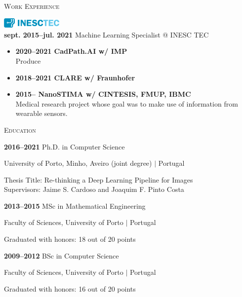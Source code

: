 \documentclass[12pt]{article}
\begin{document}
\begin{minipage}[t]{0.55\textwidth}
\setlength{\parskip}{1em}

\textsc{\large Work Experience}

\includegraphics[width=8em]{imgs/career-inesctec.png}\\
\textbf{sept. 2015--jul. 2021} Machine Learning Specialist @ INESC TEC
\begin{itemize}
\item \textbf{2020--2021 CadPath.AI w/ IMP}\\
Produce
\item \textbf{2018--2021 CLARE w/ Fraunhofer}
\item \textbf{2015-- NanoSTIMA w/ CINTESIS, FMUP, IBMC}\\
Medical research project whose goal was to make use of information from wearable sensors.
\end{itemize}
\end{minipage}
\hfill\raisebox{-.425\textheight}{\rule{0.5pt}{.45\textheight}}\hfill
\begin{minipage}[t]{0.40\textwidth}
\setlength{\parskip}{1em}

\textsc{\large Education}

\textbf{2016--2021} Ph.D. in Computer Science\\
{\footnotesize University of Porto, Minho, Aveiro (joint degree) $\vert$ Portugal

Thesis Title: Re-thinking a Deep Learning Pipeline for Images\\
Supervisors: Jaime S. Cardoso and Joaquim F. Pinto Costa}


\textbf{2013--2015} MSc in Mathematical Engineering\\
{\footnotesize Faculty of Sciences, University of Porto $\vert$ Portugal

Graduated with honors: 18 out of 20 points}

\textbf{2009--2012} BSc in Computer Science\\
{\footnotesize Faculty of Sciences, University of Porto $\vert$ Portugal

Graduated with honors: 16 out of 20 points}

\end{minipage}
\end{document}
